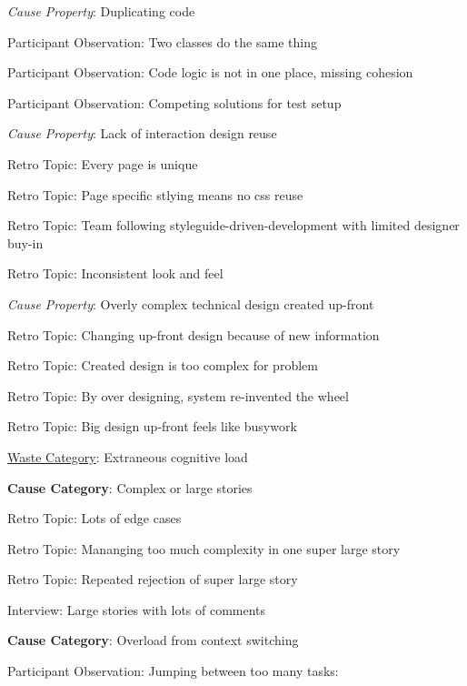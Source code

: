 \quad \quad \textit{Cause Property}: Duplicating code

\quad \quad \quad Participant Observation: Two classes do the same thing

\quad \quad \quad Participant Observation: Code logic is not in one place, missing cohesion

\quad \quad \quad Participant Observation: Competing solutions for test setup

\quad \quad \textit{Cause Property}: Lack of interaction design reuse

\quad \quad \quad Retro Topic: Every page is unique

\quad \quad \quad Retro Topic: Page specific stlying means no css reuse

\quad \quad \quad Retro Topic: Team following styleguide-driven-development with limited designer buy-in

\quad \quad \quad Retro Topic: Inconsistent look and feel

\quad \quad \textit{Cause Property}: Overly complex technical design created up-front

\quad \quad \quad Retro Topic: Changing up-front design because of new information

\quad \quad \quad Retro Topic: Created design is too complex for problem

\quad \quad \quad Retro Topic: By over designing, system re-invented the wheel

\quad \quad \quad Retro Topic: Big design up-front feels like busywork







\underline{Waste Category}: Extraneous cognitive load

\quad \textbf{Cause Category}: Complex or large stories

\quad \quad Retro Topic: Lots of edge cases

\quad \quad Retro Topic: Mananging too much complexity in one super large story

\quad \quad Retro Topic: Repeated rejection of super large story

\quad \quad Interview: Large stories with lots of comments

\quad \textbf{Cause Category}: Overload from context switching

\quad \quad Participant Observation: Jumping between too many tasks: 

